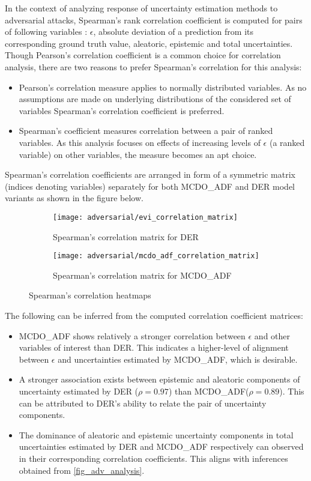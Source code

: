 In the context of analyzing response of uncertainty estimation methods to adversarial attacks, Spearman's rank correlation coefficient is computed for pairs of following variables : $\epsilon$, absolute deviation of a prediction from its corresponding ground truth value, aleatoric, epistemic and total uncertainties. Though Pearson's correlation coefficient is a common choice for correlation analysis, there are two reasons to prefer Spearman's correlation for this analysis:
\begin{itemize}
	\item Pearson's correlation measure applies to normally distributed variables. As no assumptions are made on underlying distributions of the considered set of variables Spearman's correlation coefficient is preferred.
	\item Spearman's coefficient measures correlation between a pair of ranked variables. As this analysis focuses on effects of increasing levels of $\epsilon$ (a ranked variable) on other variables, the measure becomes an apt choice.
\end{itemize} 
Spearman's correlation coefficients are arranged in form of a symmetric matrix (indices denoting variables) separately for both MCDO\_ADF and DER model variants as shown in the figure below.
\begin{figure}[H]
	\begin{subfigure}[b]{0.55\textwidth}
		\texttt{[image: adversarial/evi\_correlation\_matrix]}
		\caption{Spearman's correlation matrix for DER}
		\label{fig:five over x}
	\end{subfigure}
	\hfill
	\begin{subfigure}[b]{0.55\textwidth}
		\texttt{[image: adversarial/mcdo\_adf\_correlation\_matrix]}
		\caption{Spearman's correlation matrix for MCDO\_ADF}
		\label{fig:five over x}
	\end{subfigure}
	\caption{Spearman's correlation heatmaps}
	\label{fig_correlation_analysis}
\end{figure}
The following can be inferred from the computed correlation coefficient matrices:
\begin{itemize}
	\item MCDO\_ADF shows relatively a stronger correlation between $\epsilon$ and other variables of interest than DER. This indicates a higher-level of alignment between $\epsilon$ and uncertainties estimated by MCDO\_ADF, which is desirable.
	\item A stronger association exists between epistemic and aleatoric components of uncertainty estimated by DER ($\rho = 0.97$) than MCDO\_ADF($\rho = 0.89$). This can be attributed to DER's ability to relate the pair of uncertainty components.
	\item The dominance of aleatoric and epistemic uncertainty components in total uncertainties estimated by DER and MCDO\_ADF respectively can observed in their corresponding correlation coefficients. This aligns with inferences obtained from \ref{fig_adv_analysis}. 
\end{itemize}

